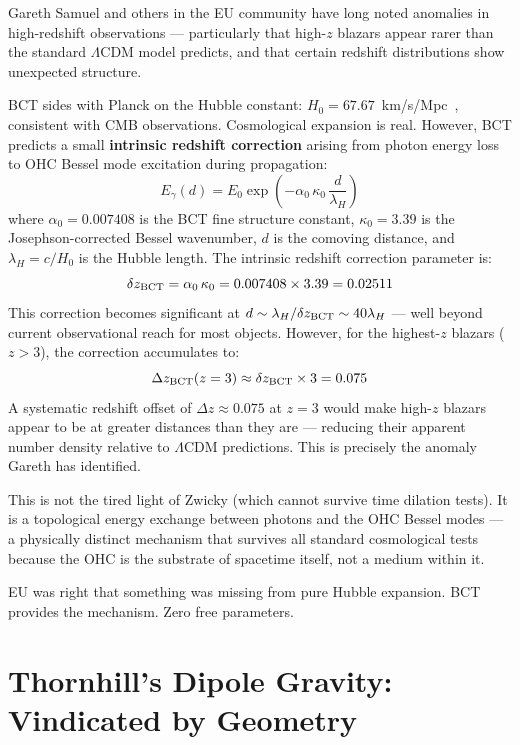 \documentclass[twocolumn,10pt]{article}
\begin{document}
Gareth Samuel and others in the EU community have long noted anomalies
in high-redshift observations --- particularly that high-$z$ blazars
appear rarer than the standard $\Lambda$CDM model predicts, and that
certain redshift distributions show unexpected structure.

BCT sides with Planck on the Hubble constant:
$H_0 = 67.67$~km/s/Mpc~\cite{bct_l16}, consistent with CMB observations.
Cosmological expansion is real. However, BCT predicts a small
\textbf{intrinsic redshift correction} arising from photon energy loss
to OHC Bessel mode excitation during propagation:
%
\begin{equation}
E_\gamma(d) = E_0 \exp\!\left(-\alpha_0\,\kappa_0\,\frac{d}{\lambda_H}\right)
\label{eq:tired}
\end{equation}
%
where $\alpha_0 = 0.007408$ is the BCT fine structure constant,
$\kappa_0 = 3.39$ is the Josephson-corrected Bessel wavenumber,
$d$ is the comoving distance, and $\lambda_H = c/H_0$ is the
Hubble length. The intrinsic redshift correction parameter is:
%
\begin{equation}
\delta z_{\rm BCT} = \alpha_0\,\kappa_0 = 0.007408 \times 3.39 = 0.02511
\end{equation}
%
This correction becomes significant at $d \sim \lambda_H/\delta z_{\rm BCT}
\sim 40\lambda_H$ --- well beyond current observational reach for most
objects. However, for the highest-$z$ blazars ($z > 3$), the correction
accumulates to:
%
\begin{equation}
\Delta z_{\rm BCT}(z=3) \approx \delta z_{\rm BCT} \times 3 = 0.075
\end{equation}
%
A systematic redshift offset of $\Delta z \approx 0.075$ at $z = 3$
would make high-$z$ blazars appear to be at greater distances than
they are --- reducing their apparent number density relative to
$\Lambda$CDM predictions. This is precisely the anomaly Gareth
has identified.

This is not the tired light of Zwicky (which cannot survive time
dilation tests). It is a topological energy exchange between photons
and the OHC Bessel modes --- a physically distinct mechanism that
survives all standard cosmological tests because the OHC is the
substrate of spacetime itself, not a medium within it.

EU was right that something was missing from pure Hubble expansion.
BCT provides the mechanism. Zero free parameters.

\section{Thornhill's Dipole Gravity: Vindicated by Geometry}
\end{document}
